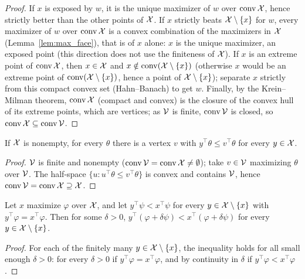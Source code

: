 \begin{proof}
  \leanok
  If $x$ is exposed by $w$, it is the unique maximizer of $w$ over $\operatorname{conv} \mathcal{X}$, hence strictly better
  than the other points of $\mathcal{X}$. If $x$ strictly beats $\mathcal{X} \setminus \{x\}$ for $w$, every
  maximizer of $w$ over $\operatorname{conv} \mathcal{X}$ is a convex combination of the maximizers in $\mathcal{X}$
  (Lemma~\ref{lem:max_face}), that is of $x$ alone: $x$ is the unique maximizer, an exposed point
  (this direction does not use the finiteness of $\mathcal{X}$). If $x$ is an extreme point of $\operatorname{conv} \mathcal{X}$,
  then $x \in \mathcal{X}$ and $x \notin \operatorname{conv}(\mathcal{X} \setminus \{x\})$ (otherwise $x$ would be an extreme point
  of $\operatorname{conv}(\mathcal{X} \setminus \{x\})$, hence a point of $\mathcal{X} \setminus \{x\}$); separate $x$ strictly from
  this compact convex set (Hahn--Banach) to get $w$. Finally, by the Krein--Milman theorem,
  $\operatorname{conv} \mathcal{X}$ (compact and convex) is the closure of the convex hull of its extreme points, which
  are vertices; as $\mathcal{V}$ is finite, $\operatorname{conv} \mathcal{V}$ is closed, so $\operatorname{conv} \mathcal{X} \subseteq \operatorname{conv} \mathcal{V}$.
\end{proof}

\begin{lemma}
  \label{lem:max_at_vertex}
  \leanok
  If $\mathcal{X}$ is nonempty, for every $\theta$ there is a vertex $v$ with $y^\top \theta \le v^\top \theta$
  for every $y \in \mathcal{X}$.
\end{lemma}

\begin{proof}
  \leanok
  $\mathcal{V}$ is finite and nonempty ($\operatorname{conv} \mathcal{V} = \operatorname{conv} \mathcal{X} \ne \emptyset$); take $v \in \mathcal{V}$ maximizing
  $\theta$ over $\mathcal{V}$. The half-space $\{u : u^\top \theta \le v^\top \theta\}$ is convex and
  contains $\mathcal{V}$, hence $\operatorname{conv} \mathcal{V} = \operatorname{conv} \mathcal{X} \supseteq \mathcal{X}$.
\end{proof}

\begin{lemma}
  \label{lem:lex_expose}
  \leanok
  Let $x$ maximize $\varphi$ over $\mathcal{X}$, and let $y^\top \psi < x^\top \psi$ for every
  $y \in \mathcal{X} \setminus \{x\}$ with $y^\top \varphi = x^\top \varphi$. Then for some $\delta > 0$,
  $y^\top (\varphi + \delta \psi) < x^\top (\varphi + \delta \psi)$ for every $y \in \mathcal{X} \setminus \{x\}$.
\end{lemma}

\begin{proof}
  \leanok
  For each of the finitely many $y \in \mathcal{X} \setminus \{x\}$, the inequality holds for all small
  enough $\delta > 0$: for every $\delta > 0$ if $y^\top \varphi = x^\top \varphi$, and by
  continuity in $\delta$ if $y^\top \varphi < x^\top \varphi$.
\end{proof}

